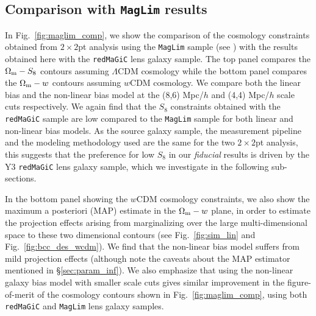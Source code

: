 \documentclass[aps, prd,twocolumn,superscriptaddress,nofootinbib,preprintnumbers]{revtex4-1}
\newcommand{\redmagic}{\texttt{redMaGiC} }
\newcommand{\maglim}{\texttt{MagLim} }
\newcommand{\blue}[1]{\textcolor{blue}{#1}}
\begin{document}
\subsection{Comparison with \maglim results}

In Fig.~\ref{fig:maglim_comp}, we show the comparison of the cosmology constraints obtained from $2\times 2$pt analysis using the \maglim sample (see \citet*{y3-2x2ptaltlensresults}) with the results obtained here with the \redmagic lens galaxy sample. The top panel compares the $\Omega_{\rm m}- S_8$ contours assuming $\Lambda$CDM cosmology while the bottom panel compares the $\Omega_{\rm m}- w$ contours assuming $w$CDM cosmology. We compare both the linear bias and the non-linear bias model at the (8,6) Mpc/$h$ and (4,4) Mpc/$h$ scale cuts respectively. We again find that the $S_8$ constraints obtained with the \redmagic sample are low compared to the \maglim sample for both linear and non-linear bias models. As the source galaxy sample, the measurement pipeline and the modeling methodology used are the same for the two $2\times 2$pt analysis, this suggests that the preference for low $S_8$ in our \textit{fiducial} results is driven by the Y3 \redmagic lens galaxy sample, which we investigate in the following sub-sections. 

In the bottom panel showing the $w$CDM cosmology constraints, we also show the maximum a posteriori (MAP) estimate in the $\Omega_{\rm m}- w$ plane, in order to estimate the projection effects arising from marginalizing over the large multi-dimensional space to these two dimensional contours (see Fig.~\ref{fig:sim_lin} and Fig.~\ref{fig:bcc_des_wcdm}). We find that the non-linear bias model suffers from mild projection effects (although note the caveats about the MAP estimator mentioned in \S\ref{sec:param_inf}). We also emphasize that using the non-linear galaxy bias model with smaller scale cuts gives similar improvement in the figure-of-merit of the cosmology contours shown in Fig.~\ref{fig:maglim_comp}, using both \redmagic and \maglim lens galaxy samples. 
\end{document}
